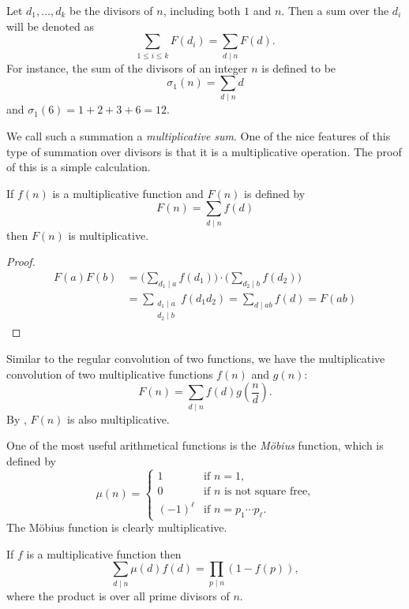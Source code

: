 Let $d_1, \ldots, d_k$ be the divisors of $n$, including both $1$ and
$n$.  Then a sum over the $d_i$ will be denoted as
\[
\sum_{1 \le i \le k} F(d_i) = \sum_{d\mid n} F(d).
\]
For instance, the sum of the divisors of an integer $n$ is defined to be
\[
\sigma_1(n) = \sum_{d \mid n}d
\]
and $\sigma_1(6) = 1+2 +3+6 = 12$.

We call such a summation a {\em multiplicative
sum}. One of the nice features of this type
of summation over divisors is that it is a multiplicative operation.
The proof of this is a simple calculation.

\begin{proposition} \label{MultiplicativeSum:Prop}      
If $f(n)$ is a multiplicative function and $F(n)$
is defined by
\[
F(n) = \sum_{d\mid n} f(d) 
\]
then $F(n)$ is multiplicative.
\end{proposition}

\begin{proof}
\[
\begin{aligned}
  F(a) F(b) &= 
      \biggl(\sum_{d_1\mid a} f(d_1) \biggr) \cdot
      \biggl(\sum_{d_2\mid b} f(d_2) \biggr)\\
    & = \sum_{\substack{d_1\mid a \\ \scriptstyle d_2\mid b}}
      f(d_1 d_2) 
     =  \sum_{d\mid ab} f(d) = F(ab)
\end{aligned}
\]
\end{proof}

Similar to the regular convolution of two functions, we have the
multiplicative convolution of two multiplicative functions $f(n)$ and
$g(n)$:
\[
F(n) = \sum_{d \mid n} f(d) g(\frac{n}{d}).
\]
By , $F(n)$ is also multiplicative. 

 One of the most useful
arithmetical functions is the {\em M\"obius} function, which is
defined by 
\[
\mu(n) =
  \begin{cases}
    1& \text{if $n = 1$,}\\
    0& \text{if $n$ is not square free,} \\
    (-1)^\ell& \text{if $n = p_1 \cdots p_\ell.$}
  \end{cases}
\]
The M\"obius function is clearly multiplicative.

\begin{proposition} \label{Inclusion:Exclusion:Prop}
If $f$ is a multiplicative function then 
\[
\sum_{d\mid n} \mu(d) f(d) = \prod_{p\mid n}(1 - f(p)),
\]
where the product is over all prime divisors of $n$.
\end{proposition}

